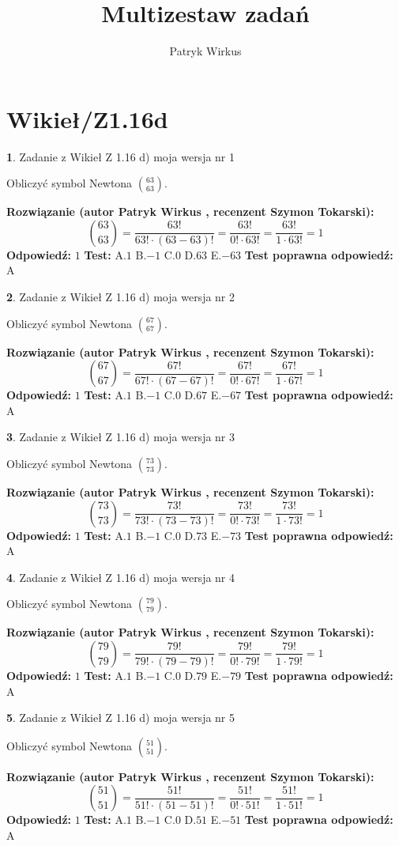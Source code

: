 \documentclass[12pt, a4paper]{article}
\title{Multizestaw zadań}
\author{Patryk Wirkus}
\date{}
\theoremstyle{definition} %
\newtheorem{zad}{}
\newcommand{\kategoria}[1]{\section{#1}}
\newcommand{\zadStart}[1]{\begin{zad}#1\newline}
\newcommand{\zadStop}{\end{zad}}
\newcommand{\rozwStart}[2]{\noindent \textbf{Rozwiązanie (autor #1 , recenzent #2): }\newline}
\newcommand{\rozwStop}{\newline}
\newcommand{\odpStart}{\noindent \textbf{Odpowiedź:}\newline}
\newcommand{\odpStop}{\newline}
\newcommand{\testStart}{\noindent \textbf{Test:}\newline}
\newcommand{\testStop}{\newline}
\newcommand{\kluczStart}{\noindent \textbf{Test poprawna odpowiedź:}\newline}
\newcommand{\kluczStop}{\newline}
\begin{document}
\maketitle

\kategoria{Wikieł/Z1.16d}


\zadStart{Zadanie z Wikieł Z 1.16 d) moja wersja nr 1}

Obliczyć symbol Newtona ${63 \choose 63}$.
\zadStop
\rozwStart{Patryk Wirkus}{Szymon Tokarski}
$${63 \choose 63} = \frac{63!}{63! \cdot (63-63)!} = \frac{63!}{0! \cdot 63!} = \frac{63!}{1 \cdot 63!} = 1$$
\rozwStop
\odpStart
$1$
\odpStop
\testStart
A.$1$ B.$-1$ C.$0$ D.$63$ E.$-63$
\testStop
\kluczStart
A
\kluczStop



\zadStart{Zadanie z Wikieł Z 1.16 d) moja wersja nr 2}

Obliczyć symbol Newtona ${67 \choose 67}$.
\zadStop
\rozwStart{Patryk Wirkus}{Szymon Tokarski}
$${67 \choose 67} = \frac{67!}{67! \cdot (67-67)!} = \frac{67!}{0! \cdot 67!} = \frac{67!}{1 \cdot 67!} = 1$$
\rozwStop
\odpStart
$1$
\odpStop
\testStart
A.$1$ B.$-1$ C.$0$ D.$67$ E.$-67$
\testStop
\kluczStart
A
\kluczStop



\zadStart{Zadanie z Wikieł Z 1.16 d) moja wersja nr 3}

Obliczyć symbol Newtona ${73 \choose 73}$.
\zadStop
\rozwStart{Patryk Wirkus}{Szymon Tokarski}
$${73 \choose 73} = \frac{73!}{73! \cdot (73-73)!} = \frac{73!}{0! \cdot 73!} = \frac{73!}{1 \cdot 73!} = 1$$
\rozwStop
\odpStart
$1$
\odpStop
\testStart
A.$1$ B.$-1$ C.$0$ D.$73$ E.$-73$
\testStop
\kluczStart
A
\kluczStop



\zadStart{Zadanie z Wikieł Z 1.16 d) moja wersja nr 4}

Obliczyć symbol Newtona ${79 \choose 79}$.
\zadStop
\rozwStart{Patryk Wirkus}{Szymon Tokarski}
$${79 \choose 79} = \frac{79!}{79! \cdot (79-79)!} = \frac{79!}{0! \cdot 79!} = \frac{79!}{1 \cdot 79!} = 1$$
\rozwStop
\odpStart
$1$
\odpStop
\testStart
A.$1$ B.$-1$ C.$0$ D.$79$ E.$-79$
\testStop
\kluczStart
A
\kluczStop



\zadStart{Zadanie z Wikieł Z 1.16 d) moja wersja nr 5}

Obliczyć symbol Newtona ${51 \choose 51}$.
\zadStop
\rozwStart{Patryk Wirkus}{Szymon Tokarski}
$${51 \choose 51} = \frac{51!}{51! \cdot (51-51)!} = \frac{51!}{0! \cdot 51!} = \frac{51!}{1 \cdot 51!} = 1$$
\rozwStop
\odpStart
$1$
\odpStop
\testStart
A.$1$ B.$-1$ C.$0$ D.$51$ E.$-51$
\testStop
\kluczStart
A
\kluczStop
\end{document}
